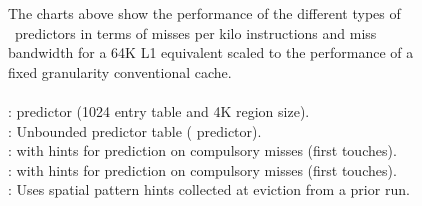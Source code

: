 {{%

\begin{figure}[h]
  \centering
    
    \caption[Predictor Performance]{ The charts above show the performance of the different types of \AC\ predictors in terms of misses per kilo instructions and miss bandwidth for a 64K L1 equivalent scaled to the performance of a fixed granularity conventional cache. \\ \\
      :  predictor (1024 entry table and 4K region size). \\
      : Unbounded predictor table ( predictor). \\ 
      :  with hints for prediction on compulsory misses (first touches). \\
      :  with hints for prediction on compulsory misses (first touches). \\
      : Uses spatial pattern hints collected at eviction from a prior run. 
    }
    \label{fig:Predictor_All_Apps}
\end{figure}

}}
